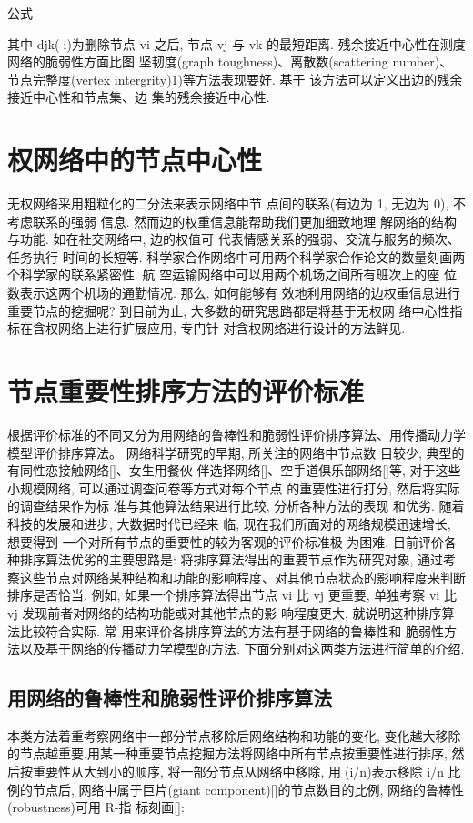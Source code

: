 			公式

			其中 djk(i)为删除节点 vi 之后, 节点 vj 与 vk 的最短距离. 残余接近中心性在测度网络的脆弱性方面比图 坚韧度(graph toughness)、离散数(scattering number)、 节点完整度(vertex intergrity)1)等方法表现要好. 基于 该方法可以定义出边的残余接近中心性和节点集、边 集的残余接近中心性.

\section{权网络中的节点中心性}
无权网络采用粗粒化的二分法来表示网络中节 点间的联系(有边为 1, 无边为 0), 不考虑联系的强弱 信息. 然而边的权重信息能帮助我们更加细致地理 解网络的结构与功能. 如在社交网络中, 边的权值可 代表情感关系的强弱、交流与服务的频次、任务执行 时间的长短等. 科学家合作网络中可用两个科学家合作论文的数量刻画两个科学家的联系紧密性. 航 空运输网络中可以用两个机场之间所有班次上的座 位数表示这两个机场的通勤情况. 那么, 如何能够有 效地利用网络的边权重信息进行重要节点的挖掘呢? 到目前为止, 大多数的研究思路都是将基于无权网 络中心性指标在含权网络上进行扩展应用, 专门针 对含权网络进行设计的方法鲜见.



\section{节点重要性排序方法的评价标准}
根据评价标准的不同又分为用网络的鲁棒性和脆弱性评价排序算法、用传播动力学模型评价排序算法。
		网络科学研究的早期, 所关注的网络中节点数 目较少, 典型的有同性恋接触网络[]、女生用餐伙 伴选择网络[]、空手道俱乐部网络[]等, 对于这些 小规模网络, 可以通过调查问卷等方式对每个节点 的重要性进行打分, 然后将实际的调查结果作为标 准与其他算法结果进行比较, 分析各种方法的表现 和优劣. 随着科技的发展和进步, 大数据时代已经来 临, 现在我们所面对的网络规模迅速增长, 想要得到 一个对所有节点的重要性的较为客观的评价标准极 为困难. 目前评价各种排序算法优劣的主要思路是: 将排序算法得出的重要节点作为研究对象, 通过考 察这些节点对网络某种结构和功能的影响程度、对其他节点状态的影响程度来判断排序是否恰当. 例如, 如果一个排序算法得出节点 vi 比 vj 更重要, 单独考察 vi 比 vj 发现前者对网络的结构功能或对其他节点的影 响程度更大, 就说明这种排序算法比较符合实际. 常 用来评价各排序算法的方法有基于网络的鲁棒性和 脆弱性方法以及基于网络的传播动力学模型的方法. 下面分别对这两类方法进行简单的介绍.
\subsection{用网络的鲁棒性和脆弱性评价排序算法}
本类方法着重考察网络中一部分节点移除后网络结构和功能的变化, 变化越大移除的节点越重要.用某一种重要节点挖掘方法将网络中所有节点按重要性进行排序, 然后按重要性从大到小的顺序, 将一部分节点从网络中移除, 用(i/n)表示移除 i/n 比例的节点后, 网络中属于巨片(giant component)[]的节点数目的比例, 网络的鲁棒性(robustness)可用 R-指 标刻画[]:

